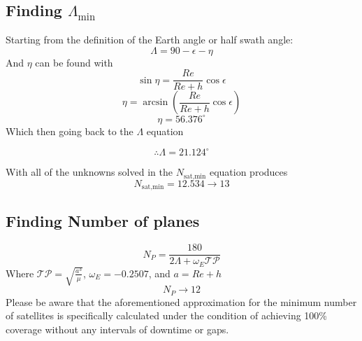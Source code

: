 \documentclass[a4paper, twoside]{article}
\begin{document}
\subsection{Finding \(\Lambda_{\min}\)}
Starting from the definition of the Earth angle or half swath angle:
\[\Lambda = 90 - \epsilon - \eta\]
And \(\eta\) can be found with
\[\sin\eta = \frac{Re}{Re + h}\cos\epsilon\]
\[\eta = \arcsin{\left(\frac{Re}{Re+h}\cos\epsilon\right)}\]
\[\eta = 56.376^{\circ}\]
Which then going back to the \(\Lambda\) equation
\begin{center}
   \[\therefore \Lambda = 21.124^{\circ}\] 
\end{center}
With all of the unknowns solved in the \(N_{\text{sat,min}}\) equation produces
\[N_{\text{sat,min}} = 12.534 \rightarrow 13\]
\subsection{Finding Number of planes}
\[N_P = \frac{180}{2\Lambda + \omega_E \mathcal{TP}}\]
Where \(\mathcal{TP} = \sqrt{\frac{a^3}{\mu}}\), \(\omega_E = -0.2507\), and \(a = Re + h\)
\[N_P \rightarrow 12\]
Please be aware that the aforementioned approximation for the minimum number of satellites 
is specifically calculated under the condition of achieving 100\% coverage without any intervals 
of downtime or gaps.
\end{document}

